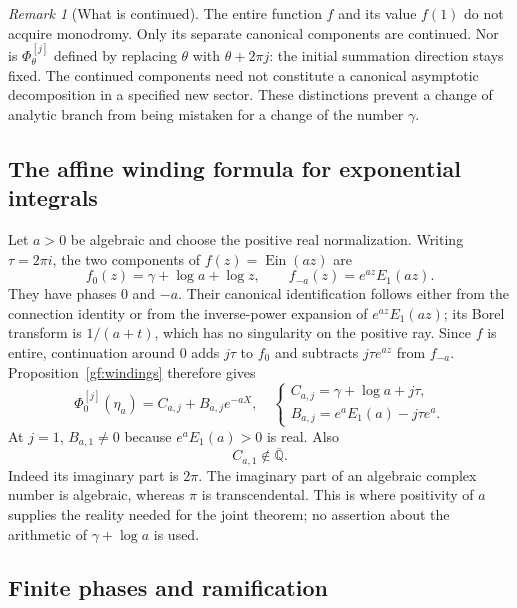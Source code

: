\documentclass[11pt,a4paper]{article}
\numberwithin{equation}{section}
\theoremstyle{definition}
\theoremstyle{remark}
\newtheorem{remark}[theorem]{Remark}
\newcommand{\A}{\overline{\mathbb Q}}
\newcommand{\Ein}{\operatorname{Ein}}
\newcommand{\Eone}{E_1}
\begin{document}
\begin{remark}[What is continued]\label{gf:what-winds}
The entire function $f$ and its value $f(1)$ do not acquire monodromy.
Only its separate canonical components are continued.  Nor is
$\Phi_\theta^{[j]}$ defined by replacing $\theta$ with $\theta+2\pi j$:
the initial summation direction stays fixed.  The continued components
need not constitute a canonical asymptotic decomposition in a specified
new sector.  These distinctions prevent a change of analytic branch
from being mistaken for a change of the number $\gamma$.
\end{remark}

\subsection{The affine winding formula for exponential integrals}
\label{gf:Ein-winding}

Let $a>0$ be algebraic and choose the positive real normalization.
Writing $\tau=2\pi i$, the two components of $f(z)=\Ein(az)$ are
\[
 f_0(z)=\gamma+\log a+\log z,
 \qquad f_{-a}(z)=e^{az}\Eone(az).
\]
They have phases $0$ and $-a$.  Their canonical identification follows
either from the connection identity or from the inverse-power expansion
of $e^{az}\Eone(az)$; its Borel transform is $1/(a+t)$, which has no
singularity on the positive ray.  Since $f$ is entire, continuation
around $0$ adds $j\tau$ to $f_0$ and subtracts $j\tau e^{az}$ from
$f_{-a}$.  Proposition~\ref{gf:windings} therefore gives
\begin{equation}\label{gf:Ein-winding-formula}
 \Phi_0^{[j]}(\eta_a)
   =C_{a,j}+B_{a,j}e^{-aX},
 \quad
 \begin{cases}
 C_{a,j}=\gamma+\log a+j\tau,\\
 B_{a,j}=e^a\Eone(a)-j\tau e^a.
 \end{cases}
\end{equation}
At $j=1$, $B_{a,1}\ne0$ because $e^a\Eone(a)>0$ is real.  Also
\begin{equation}\label{gf:trans-centers}
 C_{a,1}\notin\A.
\end{equation}
Indeed its imaginary part is $2\pi$.  The imaginary part of an algebraic
complex number is algebraic, whereas $\pi$ is transcendental.  This is
where positivity of $a$ supplies the reality needed for the joint
theorem; no assertion about the arithmetic of $\gamma+\log a$ is used.

\subsection{Finite phases and ramification}
\label{gf:descent}
\end{document}
